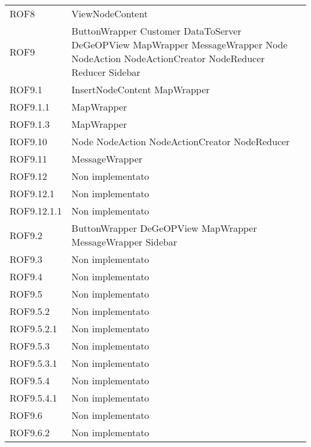 \begin{longtable}{p{2.5cm}!{\VRule[1pt]}p{5cm}}
	ROF8 & ViewNodeContent\\
	ROF9 & ButtonWrapper \newline Customer \newline DataToServer \newline DeGeOPView \newline MapWrapper \newline MessageWrapper \newline Node \newline NodeAction \newline NodeActionCreator \newline NodeReducer \newline Reducer \newline Sidebar\\
	ROF9.1 & InsertNodeContent \newline MapWrapper\\
	ROF9.1.1 & MapWrapper\\
	ROF9.1.3 & MapWrapper\\
	ROF9.10 & Node \newline NodeAction \newline NodeActionCreator \newline NodeReducer\\
	ROF9.11 & MessageWrapper\\
	ROF9.12 & Non implementato\\
	ROF9.12.1 & Non implementato\\
	ROF9.12.1.1 & Non implementato\\
	ROF9.2 & ButtonWrapper \newline DeGeOPView \newline MapWrapper \newline MessageWrapper \newline Sidebar\\
	ROF9.3 & Non implementato\\
	ROF9.4 & Non implementato\\
	ROF9.5 & Non implementato\\
	ROF9.5.2 & Non implementato\\
	ROF9.5.2.1 & Non implementato\\
	ROF9.5.3 & Non implementato\\
	ROF9.5.3.1 & Non implementato\\
	ROF9.5.4 & Non implementato\\
	ROF9.5.4.1 & Non implementato\\
	ROF9.6 & Non implementato\\
	ROF9.6.2 & Non implementato\\

\end{longtable}
